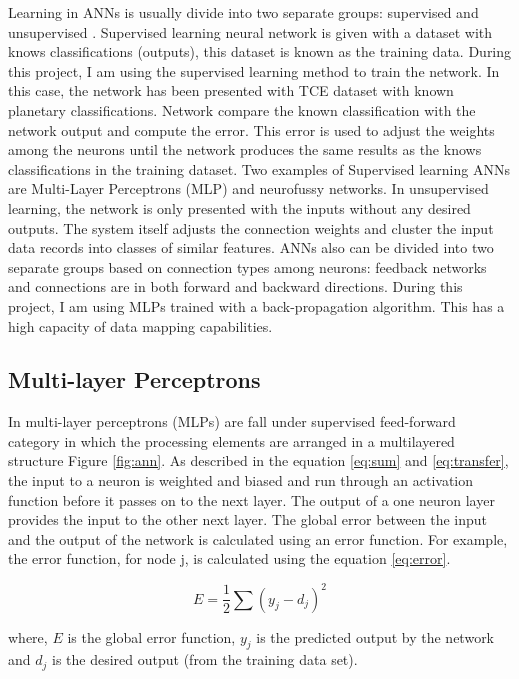 Learning in ANNs is usually divide into two separate groups: supervised and unsupervised \cite{mcculloch1943logical}.  Supervised learning neural network is given with a dataset with knows classifications (outputs), this dataset is known as the training data. During this project, I am using the supervised learning method to train the network. In this case, the network has been presented with TCE dataset with known planetary classifications. Network compare the known classification with the network output and compute the error. This error is used to adjust the weights among the neurons until the network produces the same results as the knows classifications in the training dataset. Two examples of Supervised learning ANNs are Multi-Layer Perceptrons (MLP) and neurofussy networks. In unsupervised learning, the network is only presented with the inputs without any desired outputs. The system itself adjusts the connection weights and cluster the input data records into classes of similar features.  ANNs also can be divided into two separate groups based on connection types among neurons: feedback networks and connections are in both forward and backward directions. During this project, I am using MLPs trained with a back-propagation algorithm. This has a high capacity of data mapping capabilities. 

\subsection{Multi-layer Perceptrons}
In multi-layer perceptrons (MLPs) are fall under supervised feed-forward category in which the processing elements are arranged in a multilayered structure \cite{Introduction_to_the_theory_of_neural_computation} Figure \ref{fig:ann}.  As described in the equation \ref{eq:sum} and \ref{eq:transfer}, the input to a neuron is weighted and biased and run through an activation function before it passes on to the next layer. The output of a one neuron layer provides the input to the other next layer. The global error between the input and the output of the network is calculated using an error function. For example, the error function, for node j, is calculated using the equation \ref{eq:error}.

\begin{equation}
E = \frac{1}{2}\sum{(y_j - d_j)}^{2}
\label{eq:error}
\end{equation} 

where, $E$ is the global error function, $y_j$ is the predicted output by the network and $d_j$ is the desired output (from the training data set).

